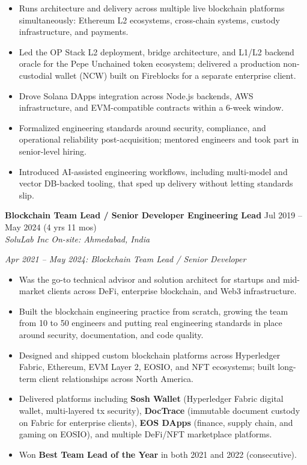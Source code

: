 \documentclass[11pt, a4paper]{article}
\newcommand{\role}[4]{%
  \noindent
  \textbf{#1} \hfill \textcolor{mutedcolor}{\small #3}\\[-2pt]
  \textit{\textcolor{accentcolor}{#2}} \hfill \textcolor{mutedcolor}{\small\textit{#4}}
  \vspace{2pt}
}
\begin{document}
\begin{itemize}
  \item Runs architecture and delivery across multiple live blockchain platforms simultaneously: Ethereum L2 ecosystems, cross-chain systems, custody infrastructure, and payments.
  \item Led the OP Stack L2 deployment, bridge architecture, and L1/L2 backend oracle for the Pepe Unchained token ecosystem; delivered a production non-custodial wallet (NCW) built on Fireblocks for a separate enterprise client.
  \item Drove Solana DApps integration across Node.js backends, AWS infrastructure, and EVM-compatible contracts within a 6-week window.
  \item Formalized engineering standards around security, compliance, and operational reliability post-acquisition; mentored engineers and took part in senior-level hiring.
  \item Introduced AI-assisted engineering workflows, including multi-model and vector DB-backed tooling, that sped up delivery without letting standards slip.
\end{itemize}

\vspace{6pt}

\role{Blockchain Team Lead / Senior Developer \textrightarrow{} Engineering Lead}{SoluLab Inc}{Jul 2019 – May 2024 (4 yrs 11 mos)}{On-site: Ahmedabad, India}

\textit{\small Apr 2021 – May 2024: Blockchain Team Lead / Senior Developer}

\begin{itemize}
  \item Was the go-to technical advisor and solution architect for startups and mid-market clients across DeFi, enterprise blockchain, and Web3 infrastructure.
  \item Built the blockchain engineering practice from scratch, growing the team from 10 to 50\textplus{} engineers and putting real engineering standards in place around security, documentation, and code quality.
  \item Designed and shipped custom blockchain platforms across Hyperledger Fabric, Ethereum, EVM Layer 2, EOSIO, and NFT ecosystems; built long-term client relationships across North America.
  \item Delivered platforms including \textbf{Sosh Wallet} (Hyperledger Fabric digital wallet, multi-layered tx security), \textbf{DocTrace} (immutable document custody on Fabric for enterprise clients), \textbf{EOS DApps} (finance, supply chain, and gaming on EOSIO), and multiple DeFi/NFT marketplace platforms.
  \item Won \textbf{Best Team Lead of the Year} in both 2021 and 2022 (consecutive).
\end{itemize}
\end{document}
